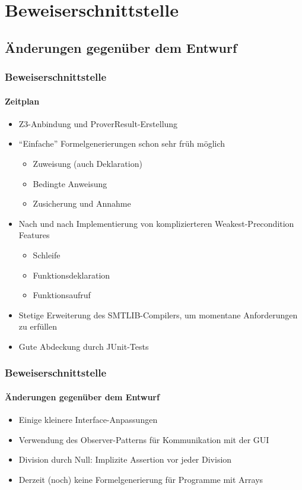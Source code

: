 \section{Beweiserschnittstelle}

\subsection{Änderungen gegenüber dem Entwurf}
\begin{frame}
\frametitle{Beweiserschnittstelle}
\framesubtitle{Zeitplan}
\begin{itemize}
    \item<+-> Z3-Anbindung und ProverResult-Erstellung
	\item<+-> ``Einfache'' Formelgenerierungen schon sehr früh möglich
    \begin{itemize}
        \item<+-> Zuweisung (auch Deklaration)
        \item<+-> Bedingte Anweisung
        \item<+-> Zusicherung und Annahme
    \end{itemize}
	\item<+-> Nach und nach Implementierung von komplizierteren Weakest-Precondition Features
    \begin{itemize}
        \item<+-> Schleife
        \item<+-> Funktionsdeklaration
        \item<+-> Funktionsaufruf
    \end{itemize}
	\item<+-> Stetige Erweiterung des SMTLIB-Compilers, um momentane Anforderungen zu erfüllen
	\item<+-> Gute Abdeckung durch JUnit-Tests
\end{itemize}
\end{frame}

\begin{frame}
\frametitle{Beweiserschnittstelle}
\framesubtitle{Änderungen gegenüber dem Entwurf}
\begin{itemize}
	\item<+-> Einige kleinere Interface-Anpassungen
	\item<+-> Verwendung des Observer-Patterns für Kommunikation mit der GUI
	\item<+-> Division durch Null: Implizite Assertion vor jeder Division
	\item<+-> Derzeit (noch) keine Formelgenerierung für Programme mit Arrays
\end{itemize}
\end{frame}

